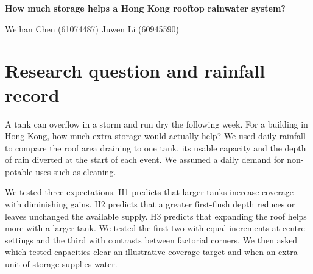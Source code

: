 \documentclass[11pt,a4paper]{article}
\newcommand{\topic}[1]{\section*{\sffamily #1}}
\begin{document}
{\Large\sffamily\bfseries How much storage helps a Hong Kong rooftop rainwater system?}\par
Weihan Chen (61074487) \quad Juwen Li (60945590)\par
\topic{1 \quad Research question and rainfall record}
A tank can overflow in a storm and run dry the following week. For a building in Hong Kong, how much extra storage would actually help? We used daily rainfall to compare the roof area draining to one tank, its usable capacity and the depth of rain diverted at the start of each event. We assumed a daily demand for non-potable uses such as cleaning.

We tested three expectations. H1 predicts that larger tanks increase coverage with diminishing gains. H2 predicts that a greater first-flush depth reduces or leaves unchanged the available supply. H3 predicts that expanding the roof helps more with a larger tank. We tested the first two with equal increments at centre settings and the third with contrasts between factorial corners. We then asked which tested capacities clear an illustrative coverage target and when an extra unit of storage supplies water.
\end{document}
